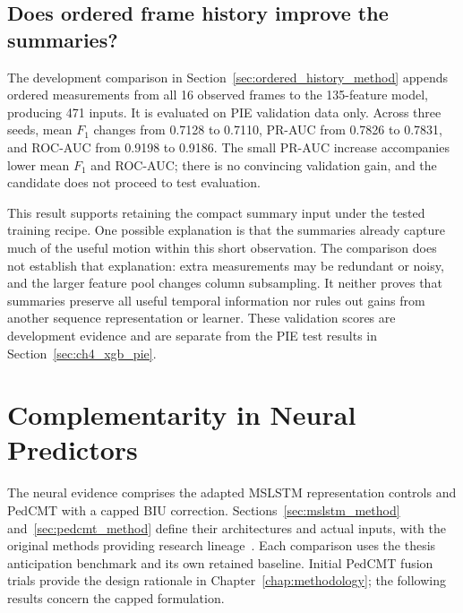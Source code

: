 
\FloatBarrier
\subsection{Does ordered frame history improve the summaries?}\label{sec:ch4_ordered_history}

The development comparison in Section~\ref{sec:ordered_history_method} appends ordered
measurements from all 16 observed frames to the 135-feature model, producing 471 inputs.
It is evaluated on PIE validation data only. Across three seeds, mean $F_1$ changes from
0.7128 to 0.7110, PR-AUC from 0.7826 to 0.7831, and ROC-AUC from 0.9198 to 0.9186.
The small PR-AUC increase accompanies lower mean $F_1$ and ROC-AUC; there is no convincing
validation gain, and the candidate does not proceed to test evaluation.

This result supports retaining the compact summary input under the tested training recipe.
One possible explanation is that the summaries already capture much of the useful motion
within this short observation. The comparison does not establish that explanation:
extra measurements may be redundant or noisy, and the larger feature pool changes column
subsampling. It neither proves that summaries preserve all useful temporal information
nor rules out gains from another sequence representation or learner. These validation
scores are development evidence and are separate from the PIE test results in
Section~\ref{sec:ch4_xgb_pie}.


\FloatBarrier
\section{Complementarity in Neural Predictors}\label{sec:ch4_neural}

The neural evidence comprises the adapted MSLSTM representation controls and PedCMT with
a capped BIU correction. Sections~\ref{sec:mslstm_method} and~\ref{sec:pedcmt_method}
define their architectures and actual inputs, with the original methods providing research
lineage~\cite{Elsamalouty2025MSLSTM,Chen2024PedCMT}. Each comparison uses the thesis
anticipation benchmark and its own retained baseline. Initial PedCMT fusion trials provide
the design rationale in Chapter~\ref{chap:methodology}; the following results concern the
capped formulation.

